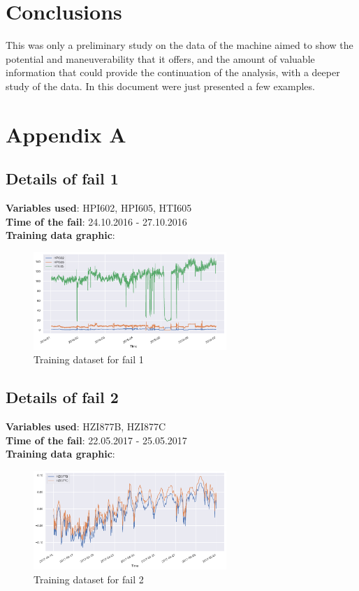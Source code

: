 \documentclass[11pt,twoside]{article}
\begin{document}
\section{Conclusions}
This was only a preliminary study on the data of the machine aimed to show the potential 
and maneuverability that it offers, and the amount of valuable information that could 
provide the continuation of the analysis, with a deeper study of the data.
In this document were just presented a few examples.

\newpage
\section{Appendix A}
\subsection{Details of fail 1} 
\textbf{Variables used}: HPI602, HPI605, HTI605\\
\textbf{Time of the fail}: 24.10.2016 - 27.10.2016\\
\textbf{Training data graphic}:
\begin{figure}[h!]
\centering
\includegraphics[width=0.65\textwidth]{train_fail0.png}
\caption{Training dataset for fail 1}\label{screenshots}
\end{figure}

\subsection{Details of fail 2}
\textbf{Variables used}: HZI877B, HZI877C\\
\textbf{Time of the fail}: 22.05.2017 - 25.05.2017\\
\textbf{Training data graphic}:  
\begin{figure}[h!]
\centering
\includegraphics[width=0.65\textwidth]{train_fail1.png}
\caption{Training dataset for fail 2}\label{screenshots}
\end{figure}
\end{document}
